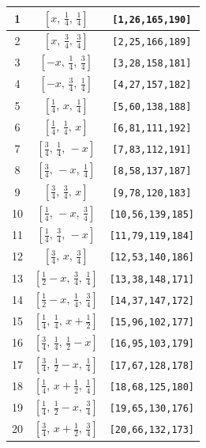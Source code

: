 \documentclass[fleqn,8pt]{jsarticle}
\begin{document}
\begin{longtable}{ccc}
1 & $\left[ x,\, \frac{1}{4},\, \frac{1}{4} \right]$ & {\tt [1,26,165,190]} \\ \hline
2 & $\left[ x,\, \frac{3}{4},\, \frac{3}{4} \right]$ & {\tt [2,25,166,189]} \\ \hline
3 & $\left[ - x,\, \frac{1}{4},\, \frac{3}{4} \right]$ & {\tt [3,28,158,181]} \\ \hline
4 & $\left[ - x,\, \frac{3}{4},\, \frac{1}{4} \right]$ & {\tt [4,27,157,182]} \\ \hline
5 & $\left[ \frac{1}{4},\, x,\, \frac{1}{4} \right]$ & {\tt [5,60,138,188]} \\ \hline
6 & $\left[ \frac{1}{4},\, \frac{1}{4},\, x \right]$ & {\tt [6,81,111,192]} \\ \hline
7 & $\left[ \frac{3}{4},\, \frac{1}{4},\, - x \right]$ & {\tt [7,83,112,191]} \\ \hline
8 & $\left[ \frac{3}{4},\, - x,\, \frac{1}{4} \right]$ & {\tt [8,58,137,187]} \\ \hline
9 & $\left[ \frac{3}{4},\, \frac{3}{4},\, x \right]$ & {\tt [9,78,120,183]} \\ \hline
10 & $\left[ \frac{1}{4},\, - x,\, \frac{3}{4} \right]$ & {\tt [10,56,139,185]} \\ \hline
11 & $\left[ \frac{1}{4},\, \frac{3}{4},\, - x \right]$ & {\tt [11,79,119,184]} \\ \hline
12 & $\left[ \frac{3}{4},\, x,\, \frac{3}{4} \right]$ & {\tt [12,53,140,186]} \\ \hline
13 & $\left[ \frac{1}{2} - x,\, \frac{3}{4},\, \frac{1}{4} \right]$ & {\tt [13,38,148,171]} \\ \hline
14 & $\left[ \frac{1}{2} - x,\, \frac{1}{4},\, \frac{3}{4} \right]$ & {\tt [14,37,147,172]} \\ \hline
15 & $\left[ \frac{1}{4},\, \frac{1}{4},\, x + \frac{1}{2} \right]$ & {\tt [15,96,102,177]} \\ \hline
16 & $\left[ \frac{3}{4},\, \frac{1}{4},\, \frac{1}{2} - x \right]$ & {\tt [16,95,103,179]} \\ \hline
17 & $\left[ \frac{3}{4},\, \frac{1}{2} - x,\, \frac{1}{4} \right]$ & {\tt [17,67,128,178]} \\ \hline
18 & $\left[ \frac{1}{4},\, x + \frac{1}{2},\, \frac{1}{4} \right]$ & {\tt [18,68,125,180]} \\ \hline
19 & $\left[ \frac{1}{4},\, \frac{1}{2} - x,\, \frac{3}{4} \right]$ & {\tt [19,65,130,176]} \\ \hline
20 & $\left[ \frac{3}{4},\, x + \frac{1}{2},\, \frac{3}{4} \right]$ & {\tt [20,66,132,173]} \\ \hline

\end{longtable}
\end{document}
